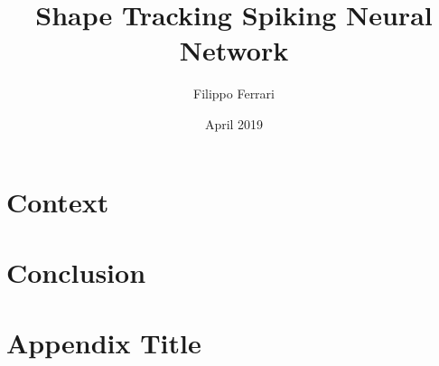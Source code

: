 \documentclass[12pt]{report}
\title{Shape Tracking Spiking Neural Network}
\author{Filippo Ferrari}
\date{April 2019}
\begin{document}






\tableofcontents

\listoffigures

\listoftables

\chapter{Context}


\chapter{Conclusion}


\appendix
\chapter{Appendix Title}


%

\printbibliography
\end{document}
